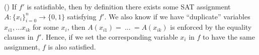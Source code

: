 \documentclass{article}
\begin{document}
\begin{solution}
\begin{subproof}[Correctness.]
(\pmi) If \( f' \) is satisfiable, then by definition there exists some SAT assignment \( A: \{x_i\}_{i=0}^n \rightarrow \{0,1\} \) satisfying \( f' \).
We also know if we have ``duplicate'' variables \( x_{i1}, ... x_{ik} \) for some \( x_i \), then \( A(x_{i1}) = \ ... \ = A(x_{ik}) \) is enforced by the equality clauses in \( f' \). Hence, if we set the corresponding variable \( x_i \) in \( f \) to have the same assignment, \( f \) is also satisfied.
\end{subproof}

\end{solution}
\pagebreak
\end{document}
